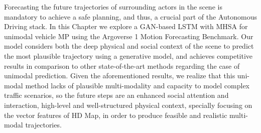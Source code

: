 Forecasting the future trajectories of surrounding actors in the scene is mandatory to achieve a safe planning, and thus, a crucial part of the Autonomous Driving stack. In this Chapter we explore a \ac{GAN}-based \ac{LSTM} with \ac{MHSA} for unimodal vehicle \ac{MP} using the Argoverse 1 Motion Forecasting Benchmark. Our model considers both the deep physical and social context of the scene to predict the most plausible trajectory using a generative model, and achieves competitive results in comparison to other state-of-the-art methods regarding the case of unimodal prediction. Given the aforementioned results, we realize that this uni-modal method lacks of plausible multi-modality and capacity to model complex traffic scenarios, so the future steps are an enhanced social attention and interaction, high-level and well-structured physical context, specially focusing on the vector features of HD Map, in order to produce feasible and realistic multi-modal trajectories.